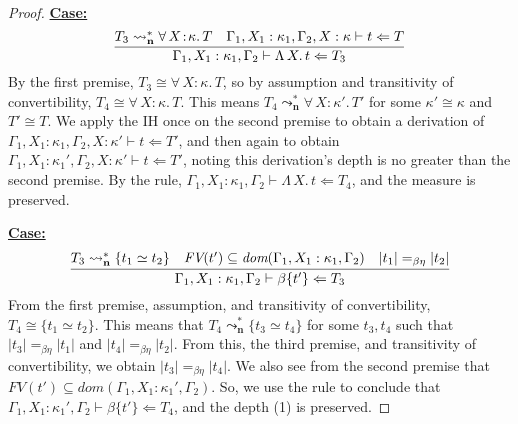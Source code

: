 \documentclass{article}
\newcommand{\abs}[4]{{#1}\, #2\! : \! #3.\, #4}
\newcommand{\absu}[3]{{#1}\, #2.\, #3}
\newcommand{\leadstocs}[0]{\ensuremath{\leadsto_{\mathbf{n}}^*}}
\newcommand{\tpcheck}[0]{\Leftarrow}
\newcommand{\startcase}[1]{\vspace{#1} \noindent\textbf{\underline{Case:}}}
\begin{document}
\begin{proof}
  \startcase{.2cm}
  \[
    \infer{
      \Gamma_1,X_1:\kappa_1,\Gamma_2\vdash \absu{\Lambda}{X}{t} \tpcheck T_3
    }{
      T_3 \leadstocs \abs{\forall}{X}{\kappa}{T}
      & \Gamma_1,X_1:\kappa_1,\Gamma_2,X:\kappa\vdash t \tpcheck T
    }
  \]
  By the first premise, \(T_3 \cong \abs{\forall}{X}{\kappa}{T}\), so by
  assumption and transitivity of convertibility, \(T_4 \cong
  \abs{\forall}{X}{\kappa}{T}\).
  This means \(T_4 \leadstocs \abs{\forall}{X}{\kappa'}{T'}\) for some
  \(\kappa' \cong \kappa\) and \(T' \cong T\).
  We apply the IH once on the second premise to obtain a derivation of
  \(\Gamma_1,X_1:\kappa_1,\Gamma_2,X:\kappa' \vdash t \tpcheck T'\), and then
  again to obtain \(\Gamma_1,X_1:\kappa_1',\Gamma_2,X:\kappa' \vdash t \tpcheck
  T'\), noting this derivation's depth is no greater than the second premise.
  By the rule, \(\Gamma_1,X_1:\kappa_1,\Gamma_2 \vdash \absu{\Lambda}{X}{t}
  \tpcheck T_4\), and the measure is preserved.

  \startcase{.2cm}
  \[
    \infer{
      \Gamma_1,X_1:\kappa_1,\Gamma_2 \vdash \beta\{t'\} \tpcheck T_3
    }{
      T_3 \leadstocs \{t_1 \simeq t_2\}
      & \textit{FV}(t')\subseteq \textit{dom}(\Gamma_1,X_1:\kappa_1,\Gamma_2)
      & |t_1| =_{\beta\eta} |t_2|
    }
  \]
  From the first premise, assumption, and transitivity of convertibility, \(T_4
  \cong \{t_1 \simeq t_2\}\).
  This means that \(T_4 \leadstocs \{t_3 \simeq t_4\}\) for some
  \(t_3,t_4\) such that \(|t_3| =_{\beta\eta} |t_1|\) and \(|t_4| =_{\beta\eta}
  |t_2|\).
  From this, the third premise, and transitivity of convertibility, we obtain
  \(|t_3| =_{\beta\eta} |t_4|\).
  We also see from the second premise that \(\textit{FV}(t') \subseteq
  \textit{dom}(\Gamma_1,X_1:\kappa_1',\Gamma_2)\).
  So, we use the rule to conclude that \(\Gamma_1,X_1:\kappa_1',\Gamma_2 \vdash
  \beta\{t'\} \tpcheck T_4\), and the depth (1) is preserved.


\end{proof}
\end{document}
